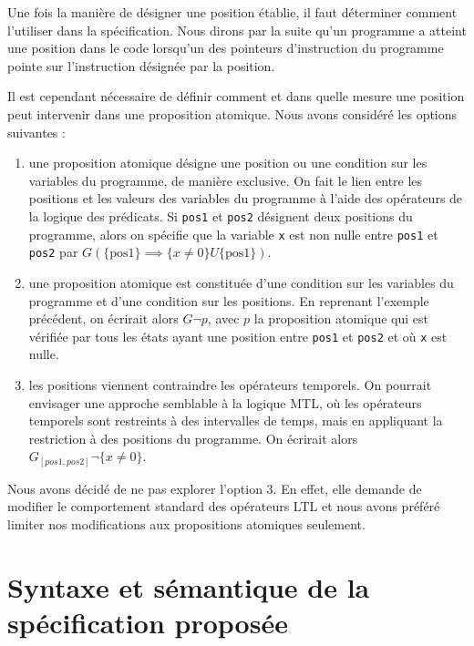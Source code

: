 Une fois la manière de désigner une position établie, il faut déterminer comment
l'utiliser dans la spécification. Nous dirons par la suite qu'un programme a
atteint une position dans le code lorsqu’un des pointeurs d'instruction du
programme pointe sur l'instruction désignée par la position.

Il est cependant nécessaire de définir comment et dans quelle mesure une
position peut intervenir dans une proposition atomique. Nous avons
considéré les options suivantes :

\begin{enumerate}
\def\labelenumi{\arabic{enumi})}
\item
  une proposition atomique désigne une position ou une condition sur les
  variables du programme, de manière exclusive. On fait le lien entre les
  positions et les valeurs des variables du programme à l'aide des opérateurs de
  la logique des prédicats. Si \texttt{pos1} et \texttt{pos2} désignent
  deux positions du programme, alors on spécifie que la variable \texttt{x}
  est non nulle entre \texttt{pos1} et \texttt{pos2} par \(G
  (\{\text{pos1}\}\implies \{x \neq 0\} U \{\text{pos1}\})\).
\item
  une proposition atomique est constituée d'une condition sur les variables du
  programme et d'une condition sur les positions. En reprenant l'exemple
  précédent, on écrirait alors \(G \lnot p\), avec \(p\) la proposition atomique
  qui est vérifiée par tous les états ayant une position entre \texttt{pos1}
  et \texttt{pos2} et où \texttt{x} est nulle.
\item
  les positions viennent contraindre les opérateurs temporels. On pourrait
  envisager une approche semblable à la logique MTL\cite{mtl_definition}, où les
  opérateurs temporels sont restreints à des intervalles de temps, mais en
  appliquant la restriction à des positions du programme. On écrirait alors
  \(G_{[pos1, pos2]} \lnot \{ x \neq 0 \}\).
\end{enumerate}

Nous avons décidé de ne pas explorer l'option 3. En effet, elle demande de
modifier le comportement standard des opérateurs LTL et nous avons préféré
limiter nos modifications aux propositions atomiques seulement.

\section{Syntaxe et sémantique de la spécification proposée}

